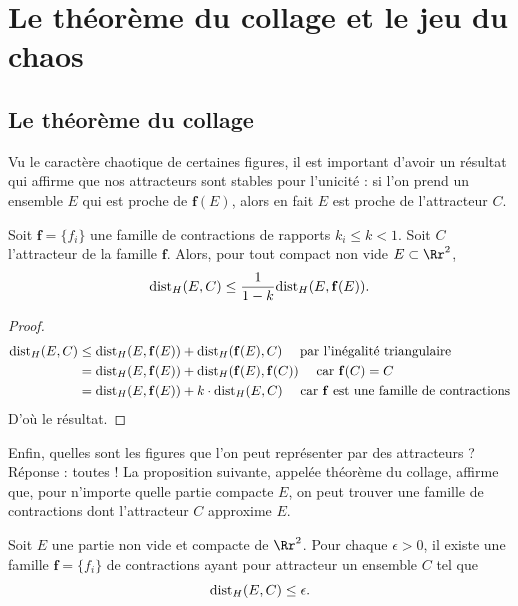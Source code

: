 \documentclass[11pt,class=report,crop=false]{standalone}
\begin{document}
\section{Le théorème du collage et le jeu du chaos}

\subsection{Le théorème du collage}


Vu le caractère \og chaotique \fg{} de certaines figures, il est important d'avoir
un résultat qui affirme que nos attracteurs sont stables pour l'unicité : si l'on prend 
un ensemble $E$ qui est proche de $\mathbf{f}(E)$,
alors en fait $E$ est proche de l'attracteur $C$. 


\begin{proposition}
\label{prop:stable}
Soit $\mathbf{f}=\{f_i\}$ une famille de contractions de rapports $k_i \le k <1$.
Soit $C$ l'attracteur de la famille $\mathbf{f}$.
Alors, pour tout compact non vide $E \subset \Rr^2$,
$$\text{dist}_H(E,C) \le \frac{1}{1-k} \text{dist}_H (E,\mathbf{f}(E)).$$
\end{proposition}

\begin{proof}
\begin{align*}
\text{dist}_H(E,C) 
   &\le \text{dist}_H(E,\mathbf{f}(E))+ \text{dist}_H(\mathbf{f}(E),C)\quad \text{ par l'inégalité triangulaire} \\
   &= \text{dist}_H(E,\mathbf{f}(E))+  \text{dist}_H(\mathbf{f}(E),\mathbf{f}(C)) \quad \text{ car } \mathbf{f}(C) = C\\  
   &= \text{dist}_H(E,\mathbf{f}(E))+  k \cdot \text{dist}_H(E,C) \quad \text{ car $\mathbf{f}$ est une famille de contractions}         
\end{align*}
D'où le résultat.               
\end{proof}


Enfin, quelles sont les figures que l'on peut représenter par des attracteurs ?
Réponse : toutes ! La proposition suivante, appelée \og{} théorème du collage\fg{},
affirme que, pour n'importe quelle partie compacte $E$, on peut trouver
une famille de contractions dont l'attracteur $C$ approxime $E$.
\begin{theoreme}[du collage]
Soit $E$ une partie non vide et compacte de $\Rr^2$.
Pour chaque $\epsilon >0$, il existe une famille $\mathbf{f}=\{f_i\}$ de contractions 
ayant pour attracteur un ensemble $C$ tel que 
$$\text{dist}_H(E,C) \le \epsilon.$$
\end{theoreme}
\end{document}
